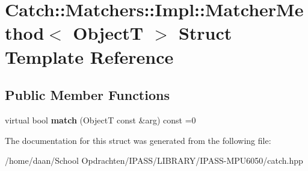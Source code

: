 \hypertarget{structCatch_1_1Matchers_1_1Impl_1_1MatcherMethod}{}\section{Catch\+:\+:Matchers\+:\+:Impl\+:\+:Matcher\+Method$<$ ObjectT $>$ Struct Template Reference}
\label{structCatch_1_1Matchers_1_1Impl_1_1MatcherMethod}
\subsection*{Public Member Functions}
\begin{DoxyCompactItemize}
\item 
\mbox{\label{structCatch_1_1Matchers_1_1Impl_1_1MatcherMethod_ae0920ff9e817acf08e1bb0cbcb044e30}} 
virtual bool {\bfseries match} (ObjectT const \&arg) const =0
\end{DoxyCompactItemize}


The documentation for this struct was generated from the following file\+:\begin{DoxyCompactItemize}
\item 
/home/daan/\+School Opdrachten/\+I\+P\+A\+S\+S/\+L\+I\+B\+R\+A\+R\+Y/\+I\+P\+A\+S\+S-\/\+M\+P\+U6050/catch.\+hpp\end{DoxyCompactItemize}
